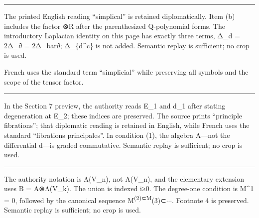 \documentclass[
  english,
  a3paper,
  a3paper]{extarticle}
\begin{document}
\par

\vspace{0.7mm}\hrule\vspace{1.6mm}

\fontsize{11}{14}\selectfont

The printed English reading ``simplical'' is retained diplomatically.
Item (b) includes the factor ⊗R after the parenthesized Q-polynomial
forms. The introductory Laplacian identity on this page has exactly
three terms, Δ\_d = 2Δ\_∂ = 2Δ\_bar∂; Δ\_\{d\^{}c\} is not added.
Semantic replay is sufficient; no crop is used.

French uses the standard term ``simplicial'' while preserving all
symbols and the scope of the tensor factor.

\clearpage



\par

\vspace{0.7mm}\hrule\vspace{1.6mm}

\fontsize{11}{14}\selectfont

In the Section 7 preview, the authority reads E\_1 and d\_1 after
stating degeneration at E\_2; these indices are preserved. The source
prints ``principle fibrations''; that diplomatic reading is retained in
English, while French uses the standard ``fibrations principales''. In
condition (1), the algebra A---not the differential d---is graded
commutative. Semantic replay is sufficient; no crop is used.

\clearpage



\par

\vspace{0.7mm}\hrule\vspace{1.6mm}

\fontsize{11}{14}\selectfont

The authority notation is Λ(V\_n), not A(V\_n), and the elementary
extension uses B = A⊗Λ(V\_k). The union is indexed i≥0. The degree-one
condition is M\^{}1 = 0, followed by the canonical sequence
M\textsuperscript{(2)⊂M}(3)⊂\(\cdots\). Footnote 4 is preserved.
Semantic replay is sufficient; no crop is used.
\end{document}
